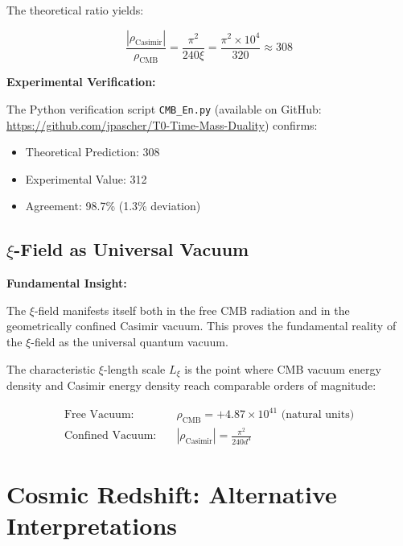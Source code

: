 \documentclass[12pt,a4paper]{article}
\newcommand{\xipar}{\xi}
\newcommand{\Lxi}{L_\xi}
\newcommand{\rhoCMB}{\rho_{\text{CMB}}}
\newcommand{\rhoCasimir}{\rho_{\text{Casimir}}}
\begin{document}
	The theoretical ratio yields:
	
	\begin{equation}
		\frac{|\rhoCasimir|}{\rhoCMB} = \frac{\pi^2}{240 \xipar} = \frac{\pi^2 \times 10^4}{320} \approx 308
	\end{equation}
	
	\begin{experiment}
		\textbf{Experimental Verification:}
		
		The Python verification script \texttt{CMB\_En.py} (available on GitHub: \url{https://github.com/jpascher/T0-Time-Mass-Duality}) confirms:
		
		\begin{itemize}
			\item Theoretical Prediction: 308
			\item Experimental Value: 312
			\item Agreement: 98.7\% (1.3\% deviation)
		\end{itemize}
	\end{experiment}
	
	\subsection{$\xi$-Field as Universal Vacuum}
	
	\begin{revolutionary}
		\textbf{Fundamental Insight:}
		
		The $\xi$-field manifests itself both in the free CMB radiation and in the geometrically confined Casimir vacuum. This proves the fundamental reality of the $\xi$-field as the universal quantum vacuum.
	\end{revolutionary}
	
	The characteristic $\xi$-length scale $\Lxi$ is the point where CMB vacuum energy density and Casimir energy density reach comparable orders of magnitude:
	
	\begin{align}
		\text{Free Vacuum:} \quad &\rhoCMB = +4.87 \times 10^{41} \text{ (natural units)} \\
		\text{Confined Vacuum:} \quad &|\rhoCasimir| = \frac{\pi^2}{240 d^4}
	\end{align}
	
	\section{Cosmic Redshift: Alternative Interpretations}
	
\end{document}
